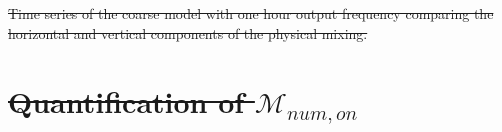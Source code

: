 \documentclass[draft]{agujournal2019}
\providecommand{\DIFdel}[1]{{\protect\color{red}\sout{#1}}}                      %
\providecommand{\DIFdelbegin}{} %
\providecommand{\DIFdelFL}[1]{\DIFdel{#1}} %
\begin{document}
\DIFdelbegin %
{%
\DIFdelFL{Time series of the coarse model with one hour output frequency comparing the horizontal and vertical components of the physical mixing. }}

\section{\DIFdel{Quantification of $\mathcal{M}_{num, on}$}} %
\addtocounter{section}{-1}%
\end{document}
